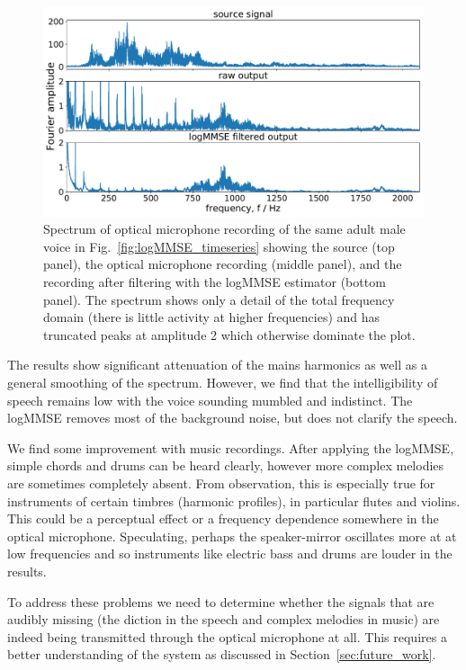 \documentclass[paper-main.tex]{subfiles}
\begin{document}
\begin{figure}
	\includegraphics[width=\textwidth]{figures/combined_spectrum_melatos.pdf}
	\caption{Spectrum of optical microphone recording of the same adult male voice in Fig.~\ref{fig:logMMSE_timeseries} showing the source (top panel), the optical microphone recording (middle panel), and the recording after filtering with the logMMSE estimator (bottom panel). The spectrum shows only a detail of the total frequency domain (there is little activity at higher frequencies) and has truncated peaks at amplitude 2 which otherwise dominate the plot.}
	\label{fig:logMMSE_spectrum}
\end{figure}

The results show significant attenuation of the mains harmonics as well as a general smoothing of the spectrum.
However, we find that the intelligibility of speech remains low with the voice sounding mumbled and indistinct. 
The logMMSE removes most of the background noise, but does not clarify the speech. 

We find some improvement with music recordings. 
After applying the logMMSE, simple chords and drums can be heard clearly, however more complex melodies are sometimes completely absent. 
From observation, this is especially true for instruments of certain timbres (harmonic profiles), in particular flutes and violins.
This could be a perceptual effect or a frequency dependence somewhere in the optical microphone. 
Speculating, perhaps the speaker-mirror oscillates more at at low frequencies and so instruments like electric bass and drums are louder in the results.


To address these problems we need to determine whether the signals that are audibly missing (the diction in the speech and complex melodies in music) are indeed being transmitted through the optical microphone at all. 
This requires a better understanding of the system as discussed in Section~\ref{sec:future_work}.
\end{document}

